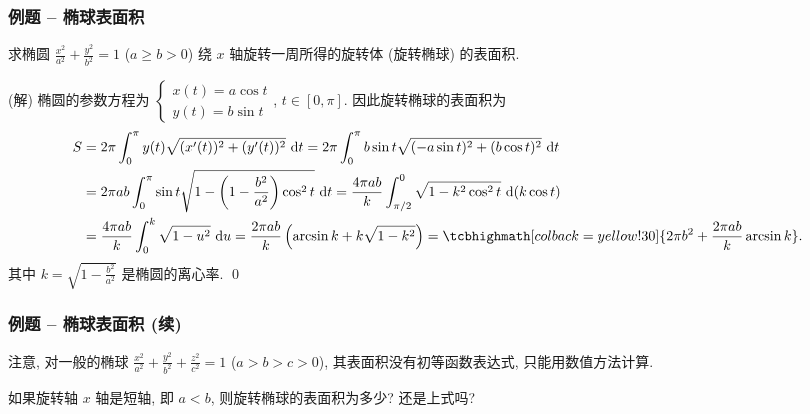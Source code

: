
\begin{frame}
\frametitle{例题 -- 椭球表面积}

\begin{question}
求椭圆 $\frac{x^2}{a^2} + \frac{y^2}{b^2} = 1$ ($a \geqslant b > 0$) 绕 $x$ 轴旋转一周所得的旋转体 (旋转椭球) 的表面积.
\end{question}

\pause

\startproof[bg=yellow, fg=red](解)
椭圆的参数方程为 $\begin{cases} x(t) = a\cos t \\[3pt] y(t) = b\sin t \end{cases}$, $t \in [0, \pi]$. 因此旋转椭球的表面积为
\begin{align*}
S & = 2\pi \int_0^{\pi} y(t) \sqrt{(x'(t))^2 + (y'(t))^2} ~ \mathrm{d}t = 2\pi \int_0^{\pi} b\sin t \sqrt{(-a\sin t)^2 + (b\cos t)^2} ~ \mathrm{d}t \\
& = 2\pi a b \int_0^{\pi} \sin t \sqrt{1 - \left( 1 - \frac{b^2}{a^2} \right) \cos^2 t} ~ \mathrm{d}t = \frac{4\pi ab}{k} \int^0_{\pi/2} \sqrt{1 - k^2 \cos^2 t} ~ \mathrm{d} (k\cos t) \\
& = \frac{4\pi ab}{k} \int_0^{k} \sqrt{1 - u^2} ~ \mathrm{d}u = \frac{2\pi ab}{k} \left( \arcsin k + k \sqrt{1 - k^2} \right) = \tcbhighmath[colback=yellow!30]{2\pi b^2 + \frac{2\pi a b}{k} \arcsin k}.
\end{align*}
其中 $k = \sqrt{1 - \frac{b^2}{a^2}}$ 是椭圆的离心率.
\qed

\end{frame}


\begin{frame}
\frametitle{例题 -- 椭球表面积 (续)}

\alert{注意}, 对一般的椭球 $\frac{x^2}{a^2} + \frac{y^2}{b^2} + \frac{z^2}{c^2} = 1$ ($a > b > c > 0$), 其表面积没有初等函数表达式, 只能用数值方法计算.

\pause
\vspace{1em}

\begin{question}
如果旋转轴 $x$ 轴是短轴, 即 $a < b$, 则旋转椭球的表面积为多少? 还是上式吗?
\end{question}

\end{frame}


